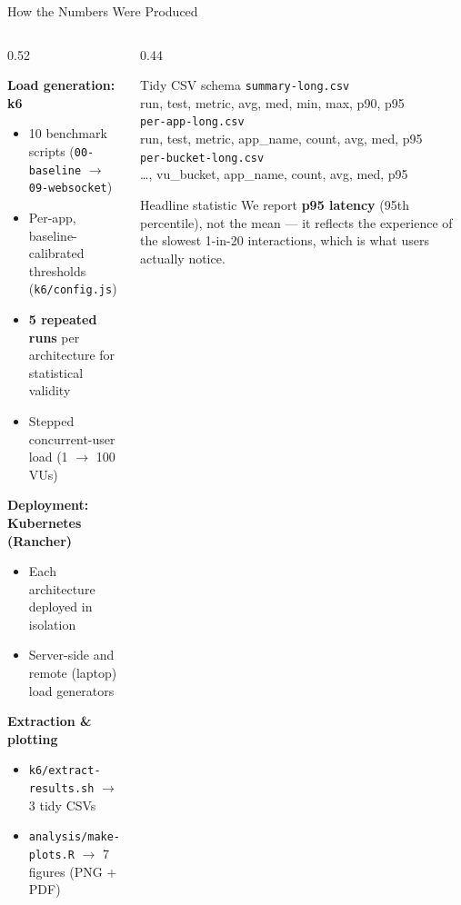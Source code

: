 \documentclass[aspectratio=169]{beamer}
\begin{document}
\begin{frame}{How the Numbers Were Produced}

\begin{columns}[T]
\begin{column}{0.52\textwidth}

\textbf{Load generation: k6}
\begin{itemize}
    \item 10 benchmark scripts (\texttt{00-baseline} $\rightarrow$ \texttt{09-websocket})
    \item Per-app, baseline-calibrated thresholds (\texttt{k6/config.js})
    \item \textbf{5 repeated runs} per architecture for statistical validity
    \item Stepped concurrent-user load (1 $\rightarrow$ 100 VUs)
\end{itemize}

\vspace{0.4em}
\textbf{Deployment: Kubernetes (Rancher)}
\begin{itemize}
    \item Each architecture deployed in isolation
    \item Server-side and remote (laptop) load generators
\end{itemize}

\vspace{0.4em}
\textbf{Extraction \& plotting}
\begin{itemize}
    \item \texttt{k6/extract-results.sh} $\rightarrow$ 3 tidy CSVs
    \item \texttt{analysis/make-plots.R} $\rightarrow$ 7 figures (PNG + PDF)
\end{itemize}

\end{column}
\begin{column}{0.44\textwidth}

\begin{block}{Tidy CSV schema}
\scriptsize
\texttt{summary-long.csv}\\
\quad run, test, metric, avg, med, min, max, p90, p95\\[0.4em]
\texttt{per-app-long.csv}\\
\quad run, test, metric, app\_name, count, avg, med, p95\\[0.4em]
\texttt{per-bucket-long.csv}\\
\quad \dots, vu\_bucket, app\_name, count, avg, med, p95
\end{block}

\begin{alertblock}{Headline statistic}
\small
We report \textbf{p95 latency} (95th percentile), not the mean ---
it reflects the experience of the slowest 1-in-20 interactions, which
is what users actually notice.
\end{alertblock}

\end{column}
\end{columns}

\end{frame}
\end{document}
